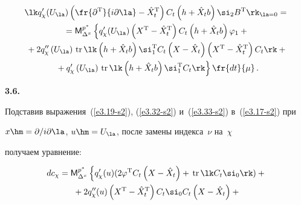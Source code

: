 \begin{multline}

\lk q_\chi' (U_\la) \left( \fr{\partial^{\mathrm{T}}}{i\partial\la} -

\hat X_t^{\mathrm{T}}\right) C_t \left(h+\hat X_t b\right) 

\si_2 B^{\mathrm{T}}\rk_{\la=0}={}\\

{}= {\sf M}_{\Delta^x}^{p^*} \left\{ q_\chi'(U_\la) \left(X^{\mathrm{T}} -

\hat X_t^{\mathrm{T}}\right) C_t\left( h+\hat X_t b\right) \varphi_1 +{}\right.\\

{}+ 2q_\chi'' \left(U_\la\right) \,\mathrm{tr}\, \lk 

\left(h+\hat X_t b\right) \si_1^{\mathrm{T}} C_t\left(X-\hat X_t\right)

\left(X^{\mathrm{T}}-\hat X_t^{\mathrm{T}}\right) C_t\rk+{}\\

\left.{}+q_\chi'\left(U_\la\right) \,\mathrm{tr}\, \lk \left(h+ \hat X_t b\right) 

\si_1^{\mathrm{T}} C_t\rk \right\}  \fr{dt}{\mu}\,.\label{e3.33-s2}

\end{multline}



\textbf{3.6.}\

Подставив выражения~(\ref{e3.19-s2}), (\ref{e3.32-s2}) и~(\ref{e3.33-s2}) в~(\ref{e3.17-s2}) при

$x\hm= \partial/i\partial \la$, $u\hm=U_\la$, после замены индекса~$\nu$ на~$\chi$

 получаем уравнение:

 

\noindent

\begin{multline*}

dc_\chi ={\sf M}_{\Delta^x}^{p^*} \left\{ 

\vphantom{\fr{2q_\chi''(u)\mathrm{tr}\, 

\left[ \left(h+ \hat X_t b\right) 

\si_1^{\mathrm{T}} C_t\left(X-\hat X_t\right) \left(X^{\mathrm{T}}-\hat 

X_t^{\mathrm{T}}\right) C_t

\right] }{\mu_t}}

q_\chi'(u) (2\varphi^{\mathrm{T}} C_t\left(

    X-\hat X_t\right) +\,\mathrm{tr}\, \lk C_t\si_0\rk) +{}\right.\\

{}+2q_\chi '' (u) \left(X^{\mathrm{T}} -\hat X_t^{\mathrm{T}}\right) C_t\si_0 

C_t \left(X-\hat X_t\right)+{}

\end{multline*}



